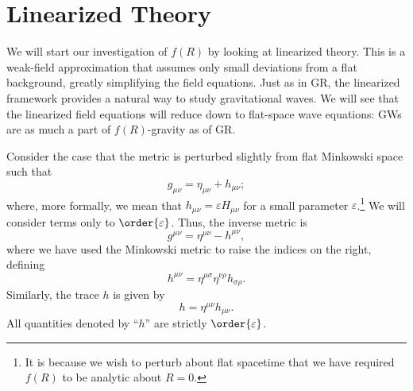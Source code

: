 \documentclass[aps,prd,reprint,showpacs]{revtex4-1}
\begin{document}
\section{Linearized Theory\label{sec:Lin}}

We will start our investigation of $f(R)$ by looking at linearized theory. This is a weak-field approximation that assumes only small deviations from a flat background, greatly simplifying the field equations. Just as in GR, the linearized framework provides a natural way to study gravitational waves. We will see that the linearized field equations will reduce down to flat-space wave equations: GWs are as much a part of $f(R)$-gravity as of GR.

Consider the case that the metric is perturbed slightly from flat Minkowski space such that
\begin{equation}
g_{\mu\nu} = \eta_{\mu\nu} + h_{\mu\nu};
\end{equation}
where, more formally, we mean that $h_{\mu\nu} = \varepsilon H_{\mu\nu}$ for a small parameter $\varepsilon$.\footnote{It is because we wish to perturb about flat spacetime that we have required $f(R)$ to be analytic about $R = 0$.} We will consider terms only to $\order{\varepsilon}$. Thus, the inverse metric is
\begin{equation}
g^{\mu\nu} = \eta^{\mu\nu} - h^{\mu\nu},
\end{equation}
where we have used the Minkowski metric to raise the indices on the right, defining
\begin{equation}
h^{\mu\nu} = \eta^{\mu\sigma}\eta^{\nu\rho}h_{\sigma\rho}.
\end{equation}
Similarly, the trace $h$ is given by
\begin{equation}
h = \eta^{\mu\nu}h_{\mu\nu}.
\end{equation}
All quantities denoted by ``$h$'' are strictly $\order{\varepsilon}$.
\end{document}
